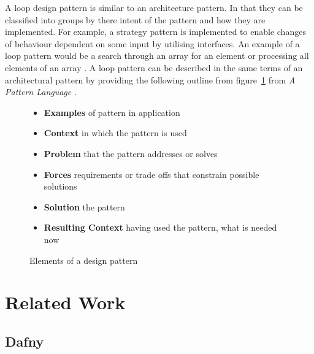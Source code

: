 A loop design pattern is similar to an architecture pattern.
In that they can be classified into groups by there intent of
the pattern and how they are implemented.
For example, a strategy pattern is implemented to enable changes of
behaviour dependent on some input by utilising interfaces.
An example of a loop pattern would be a search through
an array for an element or processing all elements of an array
\cite{loop-patterns}.
A loop pattern can be described in the same terms of an architectural pattern
by providing the following outline from figure~\ref{l:design-pattern}
from \textit{A Pattern Language} \cite{pattern-lang}.

\begin{figure}[ht]
\begin{itemize}
    \item{\textbf{Examples} of pattern in application}
    \item{\textbf{Context} in which the pattern is used}
    \item{\textbf{Problem} that the pattern addresses or solves}
    \item{\textbf{Forces} requirements or trade offs that constrain possible
        solutions}
    \item{\textbf{Solution} the pattern}
    \item{\textbf{Resulting Context} having used the pattern, what is needed
        now}
\end{itemize}
    \caption{Elements of a design pattern\cite{pattern-lang}}
    \label{l:design-pattern}
\end{figure}


\section{Related Work}


\subsection{Dafny}

